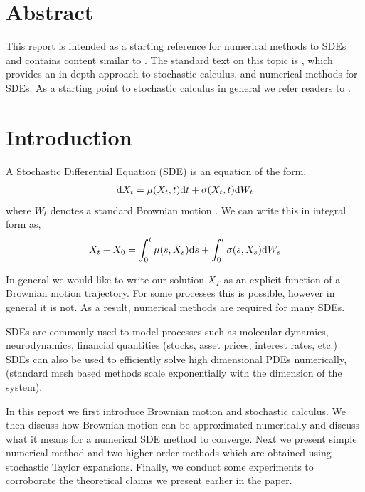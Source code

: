 \documentclass[12pt]{article}
\begin{document}
\maketitle

\section*{Abstract}
This report is intended as a starting reference for numerical methods to SDEs and contains content similar to \cite{holmes,sdes}. The standard text on this topic is \cite{kloeden}, which provides an in-depth approach to stochastic calculus, and numerical methods for SDEs. As a starting point to stochastic calculus in general we refer readers to \cite{lorig}.

\section{Introduction}

A Stochastic Differential Equation (SDE) is an equation of the form,
\begin{align}
    \mathrm{d} X_t =  \mu(X_t,t)\mathrm{d} t + \sigma(X_t,t)\mathrm{d} W_t \label{diffform}
\end{align}
where \( W_t \) denotes a standard Brownian motion \cite{lorig}. We can write this in integral form as,
\begin{align}
    X_{t} - X_{0} = \int_{0}^{t} \mu(s,X_s)\mathrm{d} s + \int_{0}^{t} \sigma(s,X_s) \mathrm{d} W_s \label{intform}
\end{align}

In general we would like to write our solution \( X_T \) as an explicit function of a Brownian motion trajectory. For some processes this is possible, however in general it is not. As a result, numerical methods are required for many SDEs.

SDEs are commonly used to model processes such as molecular dynamics, neurodynamics, financial quantities (stocks, asset prices, interest rates, etc.) SDEs can also be used to efficiently solve high dimensional PDEs numerically, (standard mesh based methods scale exponentially with the dimension of the system).

In this report we first introduce Brownian motion and stochastic calculus. We then discuss how Brownian motion can be approximated numerically and discuss what it means for a numerical SDE method to converge. Next we present simple numerical method and two higher order methods which are obtained using stochastic Taylor expansions. Finally, we conduct some experiments to corroborate the theoretical claims we present earlier in the paper.
\end{document}
